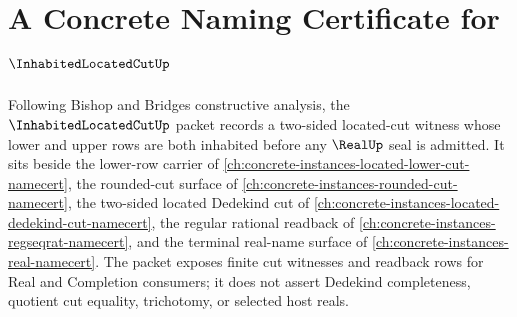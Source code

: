 \chapter{A Concrete Naming Certificate for $\InhabitedLocatedCutUp$}
\label{ch:concrete-instances-inhabited-located-cut-namecert}

Following Bishop and Bridges constructive analysis, the $\InhabitedLocatedCutUp$ packet records a two-sided located-cut witness whose lower and upper rows are both inhabited before any $\RealUp$ seal is admitted. It sits beside the lower-row carrier of \autoref{ch:concrete-instances-located-lower-cut-namecert}, the rounded-cut surface of \autoref{ch:concrete-instances-rounded-cut-namecert}, the two-sided located Dedekind cut of \autoref{ch:concrete-instances-located-dedekind-cut-namecert}, the regular rational readback of \autoref{ch:concrete-instances-regseqrat-namecert}, and the terminal real-name surface of \autoref{ch:concrete-instances-real-namecert}. The packet exposes finite cut witnesses and readback rows for Real and Completion consumers; it does not assert Dedekind completeness, quotient cut equality, trichotomy, or selected host reals.

